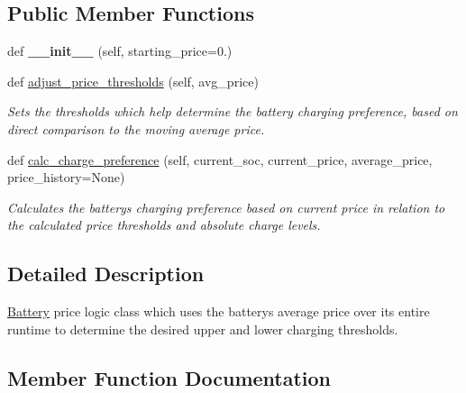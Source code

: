\subsection*{Public Member Functions}
\begin{DoxyCompactItemize}
\item 
\mbox{\label{class_build_1_1_objects_1_1battery_1_1_battery_price_logic_b_af3b7c19792092798fbbb822cdfa1291d}} 
def {\bfseries \+\_\+\+\_\+init\+\_\+\+\_\+} (self, starting\+\_\+price=0.)
\item 
\mbox{\label{class_build_1_1_objects_1_1battery_1_1_battery_price_logic_b_a071e4c7da71f4a5aabd385d4a3bb1bb8}} 
def \hyperlink{class_build_1_1_objects_1_1battery_1_1_battery_price_logic_b_a071e4c7da71f4a5aabd385d4a3bb1bb8}{adjust\+\_\+price\+\_\+thresholds} (self, avg\+\_\+price)
\begin{DoxyCompactList}\small\item\em Sets the thresholds which help determine the battery charging preference, based on direct comparison to the moving average price. \end{DoxyCompactList}\item 
def \hyperlink{class_build_1_1_objects_1_1battery_1_1_battery_price_logic_b_a3b4c1f397cc4ac0d2ae39a7ccc9bccbe}{calc\+\_\+charge\+\_\+preference} (self, current\+\_\+soc, current\+\_\+price, average\+\_\+price, price\+\_\+history=None)
\begin{DoxyCompactList}\small\item\em Calculates the battery\textquotesingle{}s charging preference based on current price in relation to the calculated price thresholds and absolute charge levels. \end{DoxyCompactList}\end{DoxyCompactItemize}


\subsection{Detailed Description}
\hyperlink{class_build_1_1_objects_1_1battery_1_1_battery}{Battery} price logic class which uses the battery\textquotesingle{}s average price over its entire runtime to determine the desired upper and lower charging thresholds. 

\subsection{Member Function Documentation}
\mbox{\label{class_build_1_1_objects_1_1battery_1_1_battery_price_logic_b_a3b4c1f397cc4ac0d2ae39a7ccc9bccbe}} 
